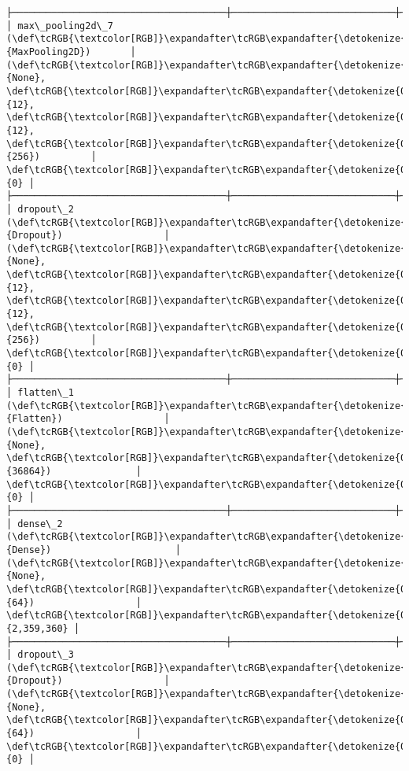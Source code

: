 \documentclass[11pt]{article}
\begin{document}
\begin{Verbatim}[commandchars=\\\{\}]
├──────────────────────────────────────┼─────────────────────────────┼─────────────────┤
│ max\_pooling2d\_7 (\def\tcRGB{\textcolor[RGB]}\expandafter\tcRGB\expandafter{\detokenize{0,135,255}}{MaxPooling2D})       │ (\def\tcRGB{\textcolor[RGB]}\expandafter\tcRGB\expandafter{\detokenize{0,215,255}}{None}, \def\tcRGB{\textcolor[RGB]}\expandafter\tcRGB\expandafter{\detokenize{0,175,0}}{12}, \def\tcRGB{\textcolor[RGB]}\expandafter\tcRGB\expandafter{\detokenize{0,175,0}}{12}, \def\tcRGB{\textcolor[RGB]}\expandafter\tcRGB\expandafter{\detokenize{0,175,0}}{256})         │               \def\tcRGB{\textcolor[RGB]}\expandafter\tcRGB\expandafter{\detokenize{0,175,0}}{0} │
├──────────────────────────────────────┼─────────────────────────────┼─────────────────┤
│ dropout\_2 (\def\tcRGB{\textcolor[RGB]}\expandafter\tcRGB\expandafter{\detokenize{0,135,255}}{Dropout})                  │ (\def\tcRGB{\textcolor[RGB]}\expandafter\tcRGB\expandafter{\detokenize{0,215,255}}{None}, \def\tcRGB{\textcolor[RGB]}\expandafter\tcRGB\expandafter{\detokenize{0,175,0}}{12}, \def\tcRGB{\textcolor[RGB]}\expandafter\tcRGB\expandafter{\detokenize{0,175,0}}{12}, \def\tcRGB{\textcolor[RGB]}\expandafter\tcRGB\expandafter{\detokenize{0,175,0}}{256})         │               \def\tcRGB{\textcolor[RGB]}\expandafter\tcRGB\expandafter{\detokenize{0,175,0}}{0} │
├──────────────────────────────────────┼─────────────────────────────┼─────────────────┤
│ flatten\_1 (\def\tcRGB{\textcolor[RGB]}\expandafter\tcRGB\expandafter{\detokenize{0,135,255}}{Flatten})                  │ (\def\tcRGB{\textcolor[RGB]}\expandafter\tcRGB\expandafter{\detokenize{0,215,255}}{None}, \def\tcRGB{\textcolor[RGB]}\expandafter\tcRGB\expandafter{\detokenize{0,175,0}}{36864})               │               \def\tcRGB{\textcolor[RGB]}\expandafter\tcRGB\expandafter{\detokenize{0,175,0}}{0} │
├──────────────────────────────────────┼─────────────────────────────┼─────────────────┤
│ dense\_2 (\def\tcRGB{\textcolor[RGB]}\expandafter\tcRGB\expandafter{\detokenize{0,135,255}}{Dense})                      │ (\def\tcRGB{\textcolor[RGB]}\expandafter\tcRGB\expandafter{\detokenize{0,215,255}}{None}, \def\tcRGB{\textcolor[RGB]}\expandafter\tcRGB\expandafter{\detokenize{0,175,0}}{64})                  │       \def\tcRGB{\textcolor[RGB]}\expandafter\tcRGB\expandafter{\detokenize{0,175,0}}{2,359,360} │
├──────────────────────────────────────┼─────────────────────────────┼─────────────────┤
│ dropout\_3 (\def\tcRGB{\textcolor[RGB]}\expandafter\tcRGB\expandafter{\detokenize{0,135,255}}{Dropout})                  │ (\def\tcRGB{\textcolor[RGB]}\expandafter\tcRGB\expandafter{\detokenize{0,215,255}}{None}, \def\tcRGB{\textcolor[RGB]}\expandafter\tcRGB\expandafter{\detokenize{0,175,0}}{64})                  │               \def\tcRGB{\textcolor[RGB]}\expandafter\tcRGB\expandafter{\detokenize{0,175,0}}{0} │

\end{Verbatim}
\end{document}
